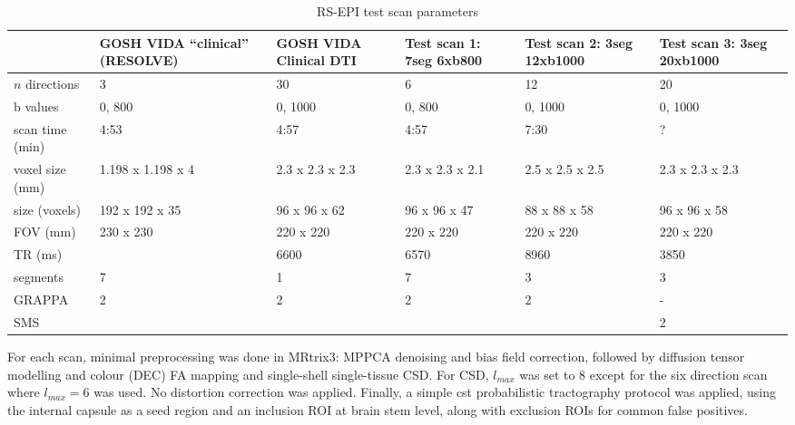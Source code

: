 
\begin{table}
  \caption{RS-EPI test scan parameters}
  \label{tab:rsepi}
  \small
  \begin{tabularx}{\textwidth}{l X X X X X}
    & GOSH VIDA “clinical” (RESOLVE) & GOSH VIDA Clinical DTI & Test scan 1: 7seg 6xb800 & Test scan 2: 3seg 12xb1000 & Test scan 3: 3seg 20xb1000 \\
  \hline
   $n$ directions & 3 & 30 & 6 & 12 & 20 \\
   b values & 0, 800 & 0, 1000 & 0, 800 & 0, 1000 & 0, 1000 \\
   scan time (min) & 4:53 & 4:57 & 4:57 & 7:30 & ? \\
   voxel size (mm) & 1.198 x 1.198 x 4 & 2.3 x 2.3 x 2.3 & 2.3 x 2.3 x 2.1 & 2.5 x 2.5 x 2.5 & 2.3 x 2.3 x 2.3 \\
   size (voxels) & 192 x 192 x 35  & 96 x 96 x 62 & 96 x 96 x 47 & 88 x 88 x 58 & 96 x 96 x 58 \\
   FOV (mm)  & 230 x 230  & 220 x 220 & 220 x 220 & 220 x 220 & 220 x 220 \\
   TR (ms) &  & 6600 & 6570 & 8960 & 3850 \\
   segments & 7 & 1 & 7 & 3 & 3 \\
   GRAPPA & 2 & 2 & 2 & 2 & - \\
   SMS &  &  &  &  & 2 \\
  \end{tabularx}
\end{table}

For each scan, minimal preprocessing was done in MRtrix3:\autocite{Tournier2019} MPPCA denoising and bias field correction, followed by diffusion tensor modelling and colour (DEC) FA mapping and single-shell single-tissue CSD.
For CSD, $l_{max}$ was set to 8 except for the six direction scan where $l_{max}=6$ was used.
No distortion correction was applied.
Finally, a simple \gls{cst} probabilistic tractography protocol was applied, using the internal capsule as a seed region and an inclusion ROI at brain stem level, along with exclusion ROIs for common false positives.

